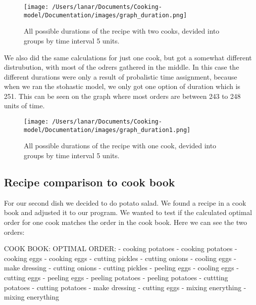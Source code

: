 \begin{figure}[H]
    \centerline{\texttt{[image: /Users/lanar/Documents/Cooking-model/Documentation/images/graph\_duration.png]}}
    \caption{All possible durations of the recipe with two cooks, devided into groups by time interval 5 units.}
    \label{fig4}
\end{figure}

We also did the same calculations for just one cook, but got a somewhat different distrubution, with most of the odrers gathered in the middle. In this case the different durations were only a result of probalistic time assignment, 
because when we ran the stohastic model, we only got one option of duration which is 251. This can be seen on the graph where most orders are between 243 to 248 units of time. 

\begin{figure}[H]
    \centerline{\texttt{[image: /Users/lanar/Documents/Cooking-model/Documentation/images/graph\_duration1.png]}}
    \caption{All possible durations of the recipe with one cook, devided into groups by time interval 5 units.}
    \label{fig5}
\end{figure}

\newpage
\subsection{Recipe comparison to cook book}
For our second dish we decided to do potato salad. We found a recipe in a cook book and adjusted it to our program. We wanted to test if the calculated optimal order for one cook matches the order in the cook book.
Here we can see the two orders:

\begin{verbnobox}[\fontsize{10pt}{10pt}\selectfont]
    COOK BOOK:                                  OPTIMAL ORDER:
    - cooking potatoes                          - cooking potatoes
    - cooking eggs                              - cooking eggs
    - cutting pickles                           - cutting onions
    - cooling eggs                              - make dressing
    - cutting onions                            - cutting pickles
    - peeling eggs                              - cooling eggs
    - cutting eggs                              - peeling eggs
    - peeling potatoes                          - peeling potatoes
    - cuttting potatoes                         - cutting potatoes
    - make dressing                             - cutting eggs
    - mixing enerything                         - mixing enerything
\end{verbnobox}

